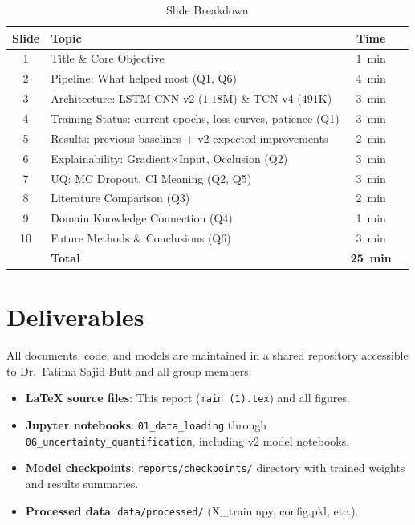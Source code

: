 \documentclass[10pt,journal,compsoc]{IEEEtran}
\begin{document}
\begin{table}[h]
\caption{Slide Breakdown}
\label{tab:slides}
\centering
\begin{tabular}{clcr}
\toprule
\textbf{Slide} & \textbf{Topic} & \textbf{Time} \\
\midrule
1 & Title \& Core Objective & 1~min \\
2 & Pipeline: What helped most (Q1, Q6) & 4~min \\
3 & Architecture: LSTM-CNN v2 ($1.18$M) \& TCN v4 ($491$K) & 3~min \\
4 & Training Status: current epochs, loss curves, patience (Q1) & 3~min \\
5 & Results: previous baselines + v2 expected improvements & 2~min \\
6 & Explainability: Gradient$\times$Input, Occlusion (Q2) & 3~min \\
7 & UQ: MC Dropout, CI Meaning (Q2, Q5) & 3~min \\
8 & Literature Comparison (Q3) & 2~min \\
9 & Domain Knowledge Connection (Q4) & 1~min \\
10 & Future Methods \& Conclusions (Q6) & 3~min \\
\midrule
& \textbf{Total} & \textbf{25~min} \\
\bottomrule
\end{tabular}
\end{table}

\section{Deliverables}
All documents, code, and models are maintained in a shared repository accessible to Dr.\ Fatima Sajid Butt and all group members:
\begin{itemize}
    \item \textbf{LaTeX source files}: This report (\texttt{main (1).tex}) and all figures.
    \item \textbf{Jupyter notebooks}: \texttt{01\_data\_loading} through \texttt{06\_uncertainty\_quantification}, including v2 model notebooks.
    \item \textbf{Model checkpoints}: \texttt{reports/checkpoints/} directory with trained weights and results summaries.
    \item \textbf{Processed data}: \texttt{data/processed/} (X\_train.npy, config.pkl, etc.).
\end{itemize}
\end{document}
